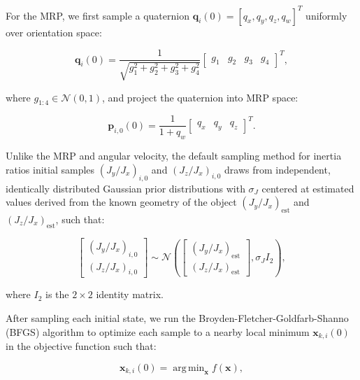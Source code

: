 \documentclass[a4paper,twocolumn]{spaceDebrisC} %
\newcommand{\vctr}[1]{\bm{#1}}
\DeclareMathOperator*{\argmin}{arg\,min}
\begin{document}
For the MRP, we first sample a quaternion $\vctr{q}_i(0) = [q_x, q_y, q_z, q_w]^T$ uniformly over orientation space:

\begin{equation}
 \vctr{q}_i(0) = \frac{1}{\sqrt{g_1^2 + g_2^2 + g_3^2 + g_4^2}} \begin{bmatrix} g_1 & g_2 & g_3 & g_4 \end{bmatrix}^T,
\end{equation}

\noindent
where $g_{1:4} \in \mathcal{N}(0,1)$, and project the quaternion into MRP space:

\begin{equation} \label{eq:mrp_sampler}
 \vctr{p}_{i,0}(0) = \frac{1}{1 + q_w} \begin{bmatrix} q_x & q_y & q_z \end{bmatrix}^T.
\end{equation}

Unlike the MRP and angular velocity, the default sampling method for inertia ratios initial samples $\left(J_y / J_x\right)_{i,0}$ and $\left(J_z / J_x\right)_{i,0}$ draws from independent, identically distributed Gaussian prior distributions with $\sigma_J$ centered at estimated values derived from the known geometry of the object $\left(J_y / J_x\right)_\text{est}$ and $\left(J_z / J_x\right)_\text{est}$, such that:

\begin{equation} \label{eq:j_sampler}
  \begin{bmatrix}
 \left(J_y / J_x\right)_{i,0} \\ \left(J_z / J_x\right)_{i,0}
  \end{bmatrix} \sim \mathcal{N} \left(\begin{bmatrix}
 \left(J_y / J_x\right)_\text{est} \\
 \left(J_z / J_x\right)_\text{est} \end{bmatrix}, \sigma_J I_2 \right),
\end{equation}

\noindent
where $I_2$ is the $2\times2$ identity matrix.

After sampling each initial state, we run the Broyden-Fletcher-Goldfarb-Shanno (BFGS) algorithm \cite{broyden1970, fletcher1970, goldfarb1970, shanno1970} to optimize each sample to a nearby local minimum $\vctr{x}_{k,i}(0)$ in the objective function such that:

\begin{equation} \label{eq:opt_problem}
 \vctr{x}_{k,i}(0) = \argmin_{\vctr{x}} f(\vctr{x}),
\end{equation}
\end{document}
